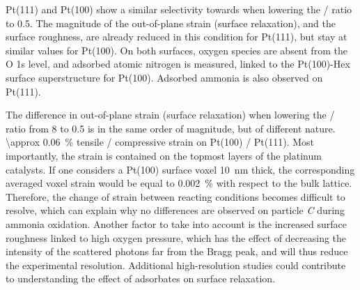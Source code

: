 Pt(111) and Pt(100) show a similar selectivity towards  when lowering the / ratio to \num{0.5}.
The magnitude of the out-of-plane strain (surface relaxation), and the surface roughness, are already reduced in this condition for Pt(111), but stay at similar values for Pt(100).
On both surfaces, oxygen species are absent from the O 1s level, and adsorbed atomic nitrogen is measured, linked to the Pt(100)-Hex surface superstructure for Pt(100).
Adsorbed ammonia is also observed on Pt(111).

The difference in out-of-plane strain (surface relaxation) when lowering the / ratio from \num{8} to \num{0.5} is in the same order of magnitude, but of different nature.
\qty{\approx 0.06}{\percent} tensile / compressive strain on Pt(100) /  Pt(111).
Most importantly, the strain is contained on the topmost layers of the platinum catalysts.
If one considers a Pt(100) surface voxel \qty{10}{\nm} thick, the corresponding averaged voxel strain would be equal to \qty{0.002}{\percent} with respect to the bulk lattice.
Therefore, the change of strain between reacting conditions becomes difficult to resolve, which can explain why no differences are observed on particle \textit{C} during ammonia oxidation.
Another factor to take into account is the increased surface roughness linked to high oxygen pressure, which has the effect of decreasing the intensity of the scattered photons far from the Bragg peak, and will thus reduce the experimental resolution.
Additional high-resolution studies could contribute to understanding the effect of adsorbates on surface relaxation.



